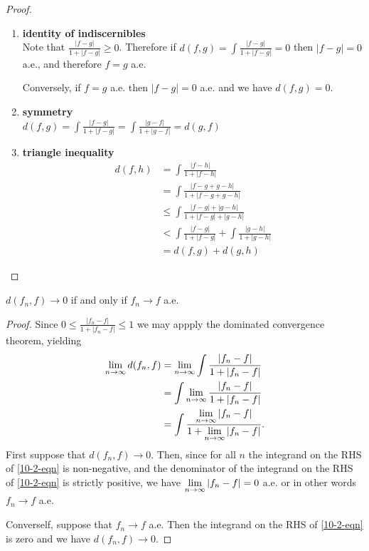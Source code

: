 \begin{proof}~\\
  \begin{enumerate}
  \item {\bf identity of indiscernibles}\\
    Note that $\frac{|f - g|}{1 + |f - g|} \geq 0$. Therefore
    if $d(f, g) = \int\frac{|f - g|}{1 + |f - g|} = 0$ then $|f - g| = 0$ a.e., and therefore $f = g$ a.e.

    Conversely, if $f = g$ a.e. then $|f - g| = 0$ a.e. and we have $d(f, g) = 0$.

  \item {\bf symmetry}\\
    $d(f, g) = \int \frac{|f - g|}{1 + |f - g|} = \int \frac{|g - f|}{1 + |g - f|} = d(g, f)$

  \item {\bf triangle inequality}
    \begin{align*}
      d(f, h)
      &= \int \frac{|f - h|}{1 + |f - h|} \\
      &= \int \frac{|f - g + g - h|}{1 + |f - g + g - h|} \\
      &\leq \int \frac{|f - g| + |g - h|}{1 + |f - g| + |g - h|} \\
      &< \int \frac{|f - g|}{1 + |f - g|} + \int \frac{|g - h|}{1 + |g - h|} \\
      &= d(f, g) + d(g, h)
    \end{align*}
  \end{enumerate}
\end{proof}

\begin{lemma}\label{10-2-lemma}
  $d(f_n, f) \to 0$ if and only if $f_n \to f$ a.e.
\end{lemma}

\begin{proof}
  Since $0 \leq \frac{|f_n - f|}{1 + |f_n - f|} \leq 1$ we may appply the dominated convergence theorem,
  yielding
  \begin{align}
    \limn d(f_n, f)
    &= \limn \int \frac{|f_n - f|}{1 + |f_n - f|} \nonumber\\
    &= \int \limn \frac{|f_n - f|}{1 + |f_n - f|} \nonumber\\
    &= \int \frac{\limn |f_n - f|}{1 + \limn |f_n - f|}. \label{10-2-eqn}
  \end{align}
  First suppose that $d(f_n, f) \to 0$. Then, since for all $n$ the integrand on the RHS of \eqref{10-2-eqn} is
  non-negative, and the denominator of the integrand on the RHS of \eqref{10-2-eqn} is strictly positive, we
  have $\limn |f_n - f| = 0$ a.e. or in other words $f_n \to f$ a.e.

  Converself, suppose that $f_n \to f$ a.e. Then the integrand on the RHS of \eqref{10-2-eqn} is zero and we
  have $d(f_n, f) \to 0$.
\end{proof}


